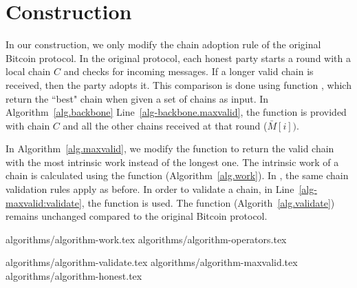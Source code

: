 \section{Construction}
In our construction, we only modify the chain adoption rule
of the original Bitcoin protocol.
In the original protocol, each honest party starts a round with a local chain
$C$ and checks for incoming messages. If a longer valid chain is received, then
the party adopts it. This comparison is done using function \maxvalid,
which return the ``best" chain when given a set of chains as input.
In Algorithm~\ref{alg.backbone} Line~\ref{alg-backbone.maxvalid}, the
\maxvalid function is provided with chain $C$ and all the other chains received at that
round ($\bar M[i])$.

In Algorithm~\ref{alg.maxvalid}, we modify the \maxvalid function to return the valid
chain with the most intrinsic work instead of the longest one. The intrinsic work
of a chain is calculated using the \work function (Algorithm~\ref{alg.work}).
In \maxvalid, the same chain validation rules apply as before. In order to
validate a chain, in Line~\ref{alg-maxvalid:validate}, the \validate function is used.
The \validate function (Algorith~\ref{alg.validate}) remains unchanged compared to
the original Bitcoin protocol.


{algorithms/algorithm-work.tex}
{algorithms/algorithm-operators.tex}

{algorithms/algorithm-validate.tex}
{algorithms/algorithm-maxvalid.tex}
{algorithms/algorithm-honest.tex}
